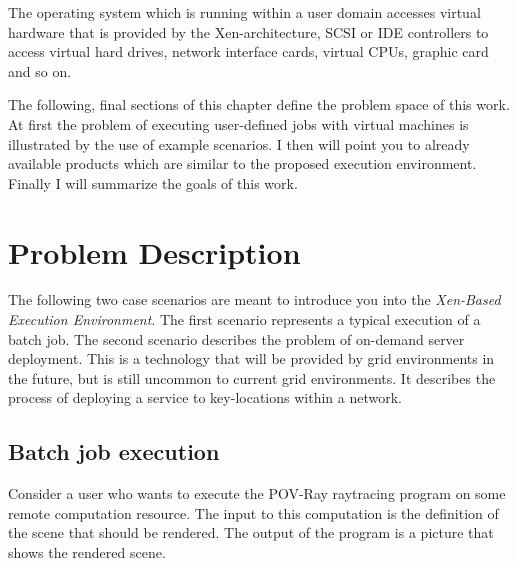 The  operating system  which  is  running within  a  user domain  accesses
virtual hardware that is provided by the Xen-architecture, \eg SCSI or IDE
controllers  to  access  virtual  hard drives,  network  interface  cards,
virtual CPUs, graphic card and so on.

The following, final sections of  this chapter define the problem space of
this  work. At  first  the  problem of  executing  user-defined jobs  with
virtual machines is  illustrated by the use of  example scenarios.  I then
will  point you to  already available  products which  are similar  to the
proposed execution environment. Finally I will summarize the goals of this
work.

\section{Problem Description}
\label{sec:problem-description}

The  following two  case scenarios  are meant  to introduce  you  into the
\emph{Xen-Based  Execution Environment}. The  first scenario  represents a
typical  execution of  a  batch  job. The  second  scenario describes  the
problem of on-demand server deployment.  This is a technology that will be
provided  by grid environments  in the  future, but  is still  uncommon to
current grid environments. It describes the process of deploying a service
to key-locations within a network.

\subsection{Batch job execution}

Consider  a user  who wants  to  execute the  POV-Ray raytracing  program
\cite{POV-Ray}  on some remote  computation resource.   The input  to this
computation is  the definition of the  scene that should  be rendered. The
output of the program is a picture that shows the rendered scene.


